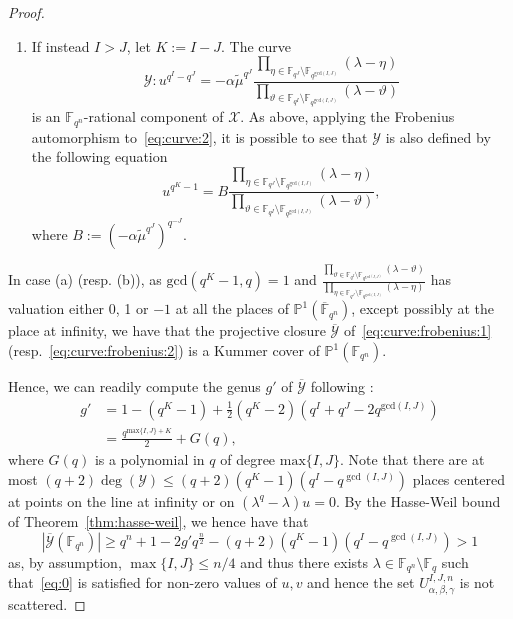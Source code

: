 \documentclass[11pt]{article}
\theoremstyle{definition}
\numberwithin{equation}{section}
\begin{document}
\begin{proof}
\begin{enumerate}
\item If instead $I > J$, let $K:=I - J$. The curve
\begin{equation}
\label{eq:curve:2}
    \mathcal{Y}: u^{q^I-q^J} = -\alpha \tilde{\mu}^{q^J}\frac{\prod_{\eta\in \mathbb{F}_{q^J}\setminus \mathbb{F}_{q^{\mathrm{gcd}(I,J)}}}\left(\lambda - \eta\right)}{\prod_{\vartheta\in \mathbb{F}_{q^I}\setminus \mathbb{F}_{q^{\mathrm{gcd}(I,J)}}}\left(\lambda - \vartheta\right)} 
\end{equation}
is an $\mathbb{F}_{q^n}$-rational component of $\mathcal{X}$.
As above, applying the Frobenius automorphism to~\eqref{eq:curve:2}, it is possible to see that $\mathcal{Y}$ is also defined by the following equation
\begin{equation}
    \label{eq:curve:frobenius:2}
    u^{q^K-1} = B \frac{\prod_{\eta\in \mathbb{F}_{q^J}\setminus \mathbb{F}_{q^{\mathrm{gcd}(I,J)}}}\left(\lambda - \eta\right)}{\prod_{\vartheta\in \mathbb{F}_{q^I}\setminus \mathbb{F}_{q^{\mathrm{gcd}(I,J)}}}\left(\lambda - \vartheta\right)}, 
\end{equation}
where $B:=\left(-\alpha\tilde{\mu}^{q^J}\right)^{q^{-J}}$.
\end{enumerate}


In case (a) (resp. (b)), as $\mathrm{gcd}(q^K-1,q)=1$ and $\frac{\prod_{\vartheta\in \mathbb{F}_{q^I}\setminus \mathbb{F}_{q^{\mathrm{gcd}(I,J)}}}\left(\lambda - \vartheta\right)}{\prod_{\eta\in \mathbb{F}_{q^J}\setminus \mathbb{F}_{q^{\mathrm{gcd}(I,J)}}}\left(\lambda - \eta\right)}$ has valuation either 0, 1 or $-1$ at all the places of $\mathbb{P}^1(\overline{\mathbb{F}}_{q^n})$, except possibly at the place at infinity, we have that the projective closure $\overline{\mathcal{Y}}$ of~\eqref{eq:curve:frobenius:1} (resp.~\eqref{eq:curve:frobenius:2}) is a Kummer cover of $\mathbb{P}^1(\mathbb{F}_{q^n})$.

Hence, we can readily compute the genus $g'$ of $\overline{\mathcal{Y}}$ following \cite[Corollary 3.7.4]{Stichtenoth}:
\begin{equation*}
\begin{split}
    g' &= 1 - (q^K-1) + \frac{1}{2}\left(q^K - 2\right)\left(q^I + q^J - 2q^{\mathrm{gcd}(I,J)}\right)\\
    &= \frac{q^{\mathrm{max}\{I,J\}+K}}{2} + G(q),
\end{split}
\end{equation*}
where $G(q)$ is a polynomial in $q$ of degree  $\mathrm{max}\{I,J\}$. Note that there are at most $(q+2)\deg(\mathcal{Y})\leq (q+2)(q^K-1)(q^I-q^{\gcd(I,J)})$ places centered at points on the line at infinity or on $(\lambda^q-\lambda)u=0$.
By the Hasse-Weil bound of Theorem~\ref{thm:hasse-weil}, we hence have that 
\begin{equation*}
    |\overline{\mathcal{Y}}(\mathbb{F}_{q^n})| \geq q^n +1 -2g'q^{\frac{n}{2}} -(q+2)(q^K-1)(q^I-q^{\gcd(I,J)})>1
\end{equation*}
as, by assumption, $\max\{I,J\}\leq n/4$ and thus there exists  $\lambda\in \mathbb{F}_{q^n}\setminus\mathbb{F}_q$ such that~\eqref{eq:0} is satisfied for non-zero values of $u,v$ and hence the set $U_{\alpha, \beta, \gamma}^{I,J,n}$ is not scattered.
\end{proof}
\end{document}
